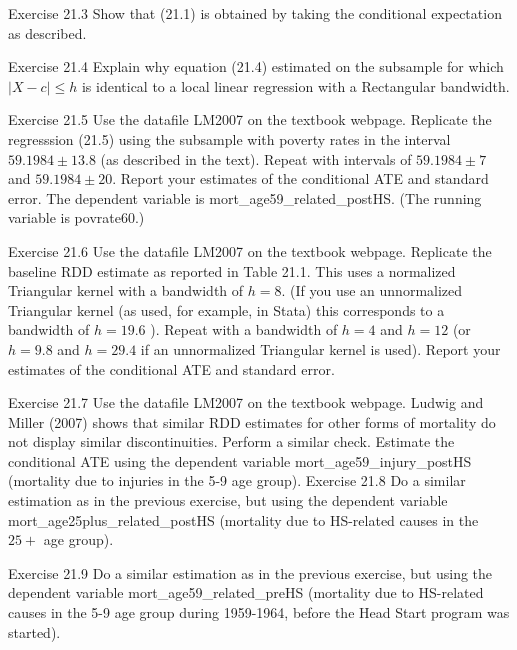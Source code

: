 \documentclass[10pt]{article}
\begin{document}
Exercise 21.3 Show that (21.1) is obtained by taking the conditional expectation as described.

Exercise 21.4 Explain why equation (21.4) estimated on the subsample for which $|X-c| \leq h$ is identical to a local linear regression with a Rectangular bandwidth.

Exercise 21.5 Use the datafile LM2007 on the textbook webpage. Replicate the regresssion (21.5) using the subsample with poverty rates in the interval $59.1984 \pm 13.8$ (as described in the text). Repeat with intervals of $59.1984 \pm 7$ and $59.1984 \pm 20$. Report your estimates of the conditional ATE and standard error. The dependent variable is mort\_age59\_related\_postHS. (The running variable is povrate60.)

Exercise 21.6 Use the datafile LM2007 on the textbook webpage. Replicate the baseline RDD estimate as reported in Table 21.1. This uses a normalized Triangular kernel with a bandwidth of $h=8$. (If you use an unnormalized Triangular kernel (as used, for example, in Stata) this corresponds to a bandwidth of $h=19.6$ ). Repeat with a bandwidth of $h=4$ and $h=12$ (or $h=9.8$ and $h=29.4$ if an unnormalized Triangular kernel is used). Report your estimates of the conditional ATE and standard error.

Exercise 21.7 Use the datafile LM2007 on the textbook webpage. Ludwig and Miller (2007) shows that similar RDD estimates for other forms of mortality do not display similar discontinuities. Perform a similar check. Estimate the conditional ATE using the dependent variable mort\_age59\_injury\_postHS (mortality due to injuries in the 5-9 age group). Exercise 21.8 Do a similar estimation as in the previous exercise, but using the dependent variable mort\_age25plus\_related\_postHS (mortality due to HS-related causes in the $25+$ age group).

Exercise 21.9 Do a similar estimation as in the previous exercise, but using the dependent variable mort\_age59\_related\_preHS (mortality due to HS-related causes in the 5-9 age group during 1959-1964, before the Head Start program was started).
\end{document}
